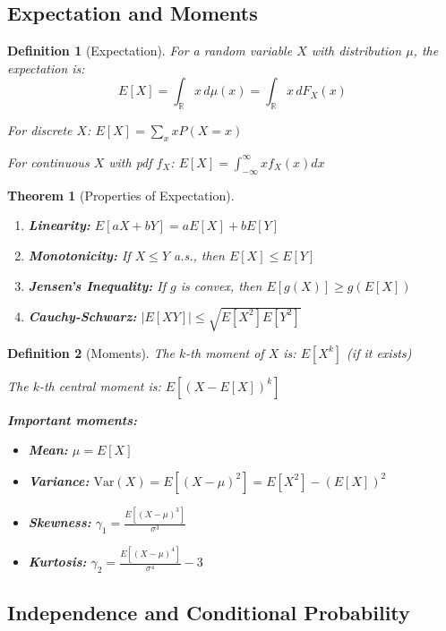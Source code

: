 \documentclass[12pt,a4paper]{article}
\newtheorem{theorem}{Theorem}[section]
\newtheorem{definition}{Definition}[section]
\theoremstyle{remark}
\begin{document}
\subsection{Expectation and Moments}

\begin{definition}[Expectation]
For a random variable $X$ with distribution $\mu$, the expectation is:
$$E[X] = \int_{\mathbb{R}} x \, d\mu(x) = \int_{\mathbb{R}} x \, dF_X(x)$$

For discrete $X$: $E[X] = \sum_{x} x P(X = x)$

For continuous $X$ with pdf $f_X$: $E[X] = \int_{-\infty}^{\infty} x f_X(x) dx$
\end{definition}

\begin{theorem}[Properties of Expectation]
\begin{enumerate}
\item \textbf{Linearity:} $E[aX + bY] = aE[X] + bE[Y]$
\item \textbf{Monotonicity:} If $X \leq Y$ a.s., then $E[X] \leq E[Y]$
\item \textbf{Jensen's Inequality:} If $g$ is convex, then $E[g(X)] \geq g(E[X])$
\item \textbf{Cauchy-Schwarz:} $|E[XY]| \leq \sqrt{E[X^2]E[Y^2]}$
\end{enumerate}
\end{theorem}

\begin{definition}[Moments]
The $k$-th moment of $X$ is: $E[X^k]$ (if it exists)

The $k$-th central moment is: $E[(X - E[X])^k]$

\textbf{Important moments:}
\begin{itemize}
\item \textbf{Mean:} $\mu = E[X]$
\item \textbf{Variance:} $\text{Var}(X) = E[(X-\mu)^2] = E[X^2] - (E[X])^2$
\item \textbf{Skewness:} $\gamma_1 = \frac{E[(X-\mu)^3]}{\sigma^3}$
\item \textbf{Kurtosis:} $\gamma_2 = \frac{E[(X-\mu)^4]}{\sigma^4} - 3$
\end{itemize}
\end{definition}

\subsection{Independence and Conditional Probability}
\end{document}
